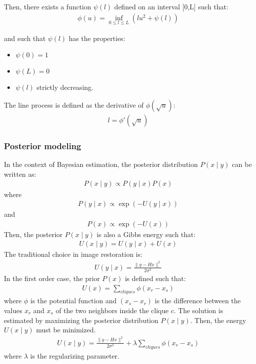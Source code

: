 Then, there exists a function $\psi(l)$ defined on an interval [0,L] 
such that: 
\begin{eqnarray} 
\phi(u) = \inf_{0\leq l\leq L}(lu^2+\psi(l))
\label{eqn_vdl}
\end{eqnarray}

and such that $\psi(l)$ has the properties:
\begin{itemize}
\item $\psi(0)=1$
\item $\psi(L)=0$ 
\item $\psi(l)$ strictly decreasing.
\end{itemize}

The line process is defined as the derivative of  
$\phi(\sqrt u)$:
\begin{eqnarray} 
l = \phi'(\sqrt u) 
\end{eqnarray}

\subsubsection{Posterior modeling}
 
In the context of Bayesian estimation, the posterior distribution  
$P({x \mid y})$ can be written as:
\begin{eqnarray}
P({x \mid y}) \propto P({y \mid x})P({x}) 
\end{eqnarray}
where 
\begin{eqnarray} 
P({y \mid x}) \propto \exp(-U({y \mid x})) 
\end{eqnarray}
and
\begin{eqnarray}
P({x}) \propto \exp(-U({x}))
\end{eqnarray}
Then, the posterior $P({x \mid y})$ is also a Gibbs energy such that:
\begin{eqnarray}
U({x \mid y}) = U({y \mid x}) + U({x})
\end{eqnarray}
The traditional choice in image restoration is:
\begin{eqnarray} 
U({y \mid x}) = \frac{\|{y-Hx}\|^2}{2\sigma^2}
\end{eqnarray}
In the first order case, the prior $P({x})$ is defined such that:
\begin{eqnarray} 
U({x}) = \sum_{cliques} \phi(x_r-x_s)
\end{eqnarray} 
where $\phi$ is the potential function and $(x_s-x_r)$ is the difference 
between the values $x_r$ and $x_s$ of the two neighbors inside the 
clique $c$.
The solution is estimated by maximizing the posterior distribution
$P({x \mid y})$.
Then, the energy $U({x \mid y})$ must be minimized.
\begin{eqnarray} 
U({x \mid y}) = \frac{\|{y-Hx}\|^2}{2\sigma^2}
               + \lambda \sum_{cliques} \phi(x_r-x_s) 
\label{eqn_cr}	       
\end{eqnarray}
where $\lambda$ is the regularizing parameter.

